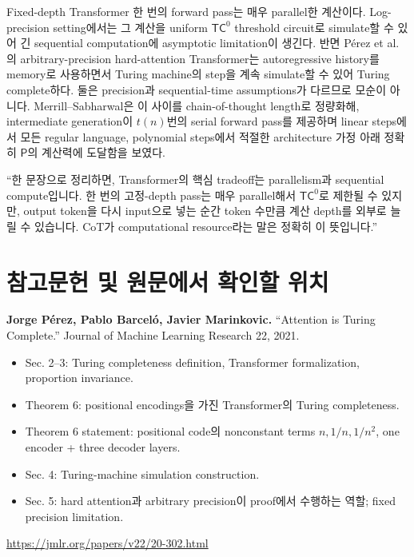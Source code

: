 \documentclass[11pt,a4paper,oneside,openany]{memoir}
\theoremstyle{definition}
\newcommand{\TC}{\mathsf{TC}}
\newcommand{\Pclass}{\mathsf{P}}
\begin{document}
Fixed-depth Transformer 한 번의 forward pass는 매우 parallel한 계산이다. Log-precision setting에서는 그 계산을 uniform $\TC^0$ threshold circuit로 simulate할 수 있어 긴 sequential computation에 asymptotic limitation이 생긴다. 반면 Pérez et al.의 arbitrary-precision hard-attention Transformer는 autoregressive history를 memory로 사용하면서 Turing machine의 step을 계속 simulate할 수 있어 Turing complete하다. 둘은 precision과 sequential-time assumptions가 다르므로 모순이 아니다. Merrill--Sabharwal은 이 사이를 chain-of-thought length로 정량화해, intermediate generation이 $t(n)$번의 serial forward pass를 제공하며 linear steps에서 모든 regular language, polynomial steps에서 적절한 architecture 가정 아래 정확히 $\Pclass$의 계산력에 도달함을 보였다.

\begin{presentbox}
``한 문장으로 정리하면, Transformer의 핵심 tradeoff는 parallelism과 sequential compute입니다. 한 번의 고정-depth pass는 매우 parallel해서 $\TC^0$로 제한될 수 있지만, output token을 다시 input으로 넣는 순간 token 수만큼 계산 depth를 외부로 늘릴 수 있습니다. CoT가 computational resource라는 말은 정확히 이 뜻입니다.''
\end{presentbox}

\chapter*{참고문헌 및 원문에서 확인할 위치}

\textbf{Jorge Pérez, Pablo Barceló, Javier Marinkovic.}
``Attention is Turing Complete.'' Journal of Machine Learning Research 22, 2021.

\begin{itemize}
  \item Sec. 2--3: Turing completeness definition, Transformer formalization, proportion invariance.
  \item Theorem 6: positional encodings을 가진 Transformer의 Turing completeness.
  \item Theorem 6 statement: positional code의 nonconstant terms $n,1/n,1/n^2$, one encoder + three decoder layers.
  \item Sec. 4: Turing-machine simulation construction.
  \item Sec. 5: hard attention과 arbitrary precision이 proof에서 수행하는 역할; fixed precision limitation.
\end{itemize}
\url{https://jmlr.org/papers/v22/20-302.html}
\end{document}
